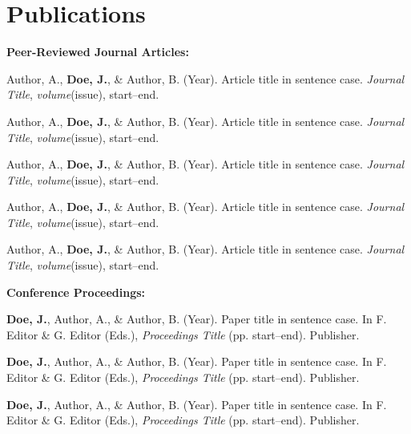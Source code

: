 \section*{Publications}

\textbf{Peer-Reviewed Journal Articles:}

\begin{citelist}

    \item Author, A., \textbf{Doe, J.}, \& Author, B. (Year). Article title in sentence case.
    \textit{Journal Title}, \textit{volume}(issue), start--end.
    \item Author, A., \textbf{Doe, J.}, \& Author, B. (Year). Article title in sentence case.
    \textit{Journal Title}, \textit{volume}(issue), start--end.
    \item Author, A., \textbf{Doe, J.}, \& Author, B. (Year). Article title in sentence case.
    \textit{Journal Title}, \textit{volume}(issue), start--end.
    \item Author, A., \textbf{Doe, J.}, \& Author, B. (Year). Article title in sentence case.
    \textit{Journal Title}, \textit{volume}(issue), start--end.
    \item Author, A., \textbf{Doe, J.}, \& Author, B. (Year). Article title in sentence case.
    \textit{Journal Title}, \textit{volume}(issue), start--end.
    

\end{citelist}

\textbf{Conference Proceedings:}

\begin{citelist}[resume]

    \item \textbf{Doe, J.}, Author, A., \& Author, B. (Year). Paper title in sentence case.
    In F. Editor \& G. Editor (Eds.),
    \textit{Proceedings Title} (pp. start--end). Publisher.

    \item \textbf{Doe, J.}, Author, A., \& Author, B. (Year). Paper title in sentence case.
    In F. Editor \& G. Editor (Eds.),
    \textit{Proceedings Title} (pp. start--end). Publisher.

    \item \textbf{Doe, J.}, Author, A., \& Author, B. (Year). Paper title in sentence case.
    In F. Editor \& G. Editor (Eds.),
    \textit{Proceedings Title} (pp. start--end). Publisher.

\end{citelist}

